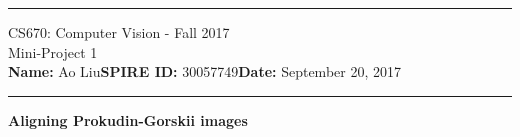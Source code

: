 \documentclass[11pt]{article}
\begin{document}
{\centering
  \rule{6.3in}{2pt}
  \vspace{0.1em}
  {\Large
    CS670: Computer Vision - Fall 2017 \\
    Mini-Project 1\\
  }
  \vspace{0.1em}
  \textbf{Name:} Ao Liu\hspace{20pt}\textbf{SPIRE ID:} 30057749\hspace{20pt}\textbf{Date:} September 20, 2017\\
  \vspace{0.1em}
  \rule{6.3in}{1.5pt}
}
\vspace{0.1pc}


\begin{problem}{25} \textbf{Aligning Prokudin-Gorskii images}\\

\end{problem}
\end{document}
